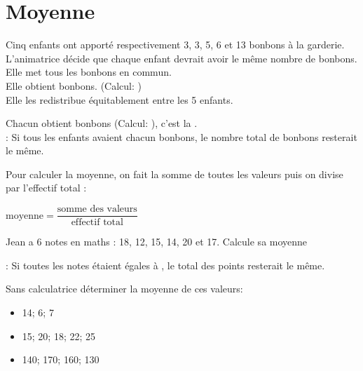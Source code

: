 \section{Moyenne}
\setcounter{exemple}{0}

\begin{exemplebox}
    Cinq enfants ont apporté respectivement 3, 3, 5, 6 et 13 bonbons à la
    garderie. L'animatrice décide que chaque enfant devrait avoir le même nombre
    de bonbons. Elle met tous les bonbons en commun. \\

    Elle obtient  bonbons. 
    (Calcul: )\\

    Elle les redistribue équitablement entre les 5 enfants.

    Chacun obtient  bonbons (Calcul: ), c'est la .\\

    : Si tous les enfants avaient
    chacun  bonbons, le nombre total de bonbons resterait le même.

\end{exemplebox}

\begin{methodebox}
    Pour calculer la moyenne, on fait la somme de toutes les valeurs puis on
    divise par l'effectif total :
    \begin{center}
        $\text{moyenne} = \dfrac{\text{somme des valeurs}}{\text{effectif
        total}} $
    \end{center}
\end{methodebox}

\begin{exemplebox}
    Jean a 6 notes en maths : 18, 12, 15, 14, 20 et 17. Calcule sa moyenne

    \vspace{5cm}

    : Si toutes les notes étaient
    égales à , le total des points resterait le même.
\end{exemplebox}


\begin{exercicebox}
    Sans calculatrice déterminer la moyenne de ces valeurs:
    \begin{itemize}
        \item 14; 6; 7
        \item 15; 20; 18; 22; 25
        \item 140; 170; 160; 130
    \end{itemize}
\end{exercicebox}
